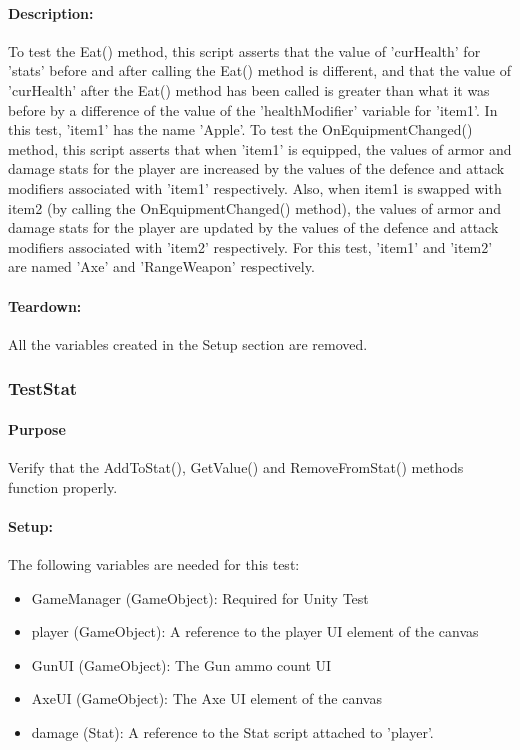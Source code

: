 \documentclass[12pt, titlepage]{article}
\begin{document}
{\begin{itemize}
\end{itemize}
\paragraph{Description: }
To test the Eat() method, this script asserts that the value of 'curHealth' for 'stats' before and after calling the Eat() method is different, and that the value of 'curHealth' after the Eat() method has been called is greater than what it was before by a difference of the value of the 'healthModifier' variable for 'item1'. In this test, 'item1' has the name 'Apple'.
\newline
To test the OnEquipmentChanged() method, this script asserts that when 'item1' is equipped, the values of armor and damage stats for the player are increased by the values of the defence and attack modifiers associated with 'item1' respectively. Also, when item1 is swapped with item2 (by calling the OnEquipmentChanged() method),  the values of armor and damage stats for the player are updated by the values of the defence and attack modifiers associated with 'item2' respectively.
For this test, 'item1' and 'item2' are named 'Axe' and 'RangeWeapon' respectively.
\paragraph{Teardown: } All the variables created in the Setup section are removed.
\subsubsection{Test\textunderscore Stat}

\paragraph{Purpose} Verify that the AddToStat(), GetValue() and RemoveFromStat() methods function properly.

\paragraph{Setup: } The following variables are needed for this test:
\begin{itemize}
	\item GameManager (GameObject): Required for Unity Test
	\item  player (GameObject): A reference to the player UI element of the canvas
	\item  GunUI (GameObject): The Gun ammo count UI
	\item AxeUI (GameObject): The Axe UI element of the canvas
	\item damage (Stat): A reference to the Stat script attached to 'player'.


\end{itemize}}
\end{document}
